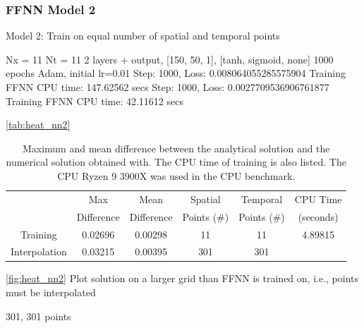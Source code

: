 \subsubsection{FFNN Model 2}
Model 2: Train on equal number of spatial and temporal points

Nx = 11
Nt = 11
2 layers + output, [150, 50, 1], [tanh, sigmoid, none] 
1000 epochs
Adam, initial lr=0.01
Step: 1000, Loss: 0.008064055285575904
Training FFNN CPU time: 147.62562 secs
Step: 1000, Loss: 0.0027709536906761877
Training FFNN CPU time: 42.11612 secs


\autoref{tab:heat_nn2}

\begin{table}[H]
\caption{Maximum and mean difference between the analytical solution and the numerical solution obtained with. The CPU time of training is also listed. The CPU Ryzen 9 3900X was used in the CPU benchmark.}
\centering
{}
\begin{tabular}{cccccc}
\hline
\hline 
& Max & Mean & Spatial & Temporal & CPU Time
\\
& Difference & Difference & Points (\#) & Points (\#) & (seconds)
\\
\hline 
\hline 
Training & 0.02696 & 0.00298 & 11 & 11 & 4.89815
\\
Interpolation & 0.03215 & 0.00395 & 301 & 301 &
\\
\hline
\hline
\end{tabular}
\label{tab:heat_nn2}
\end{table}

\autoref{fig:heat_nn2} Plot solution on a larger grid than FFNN is trained on, i.e., points must be interpolated

301, 301 points

